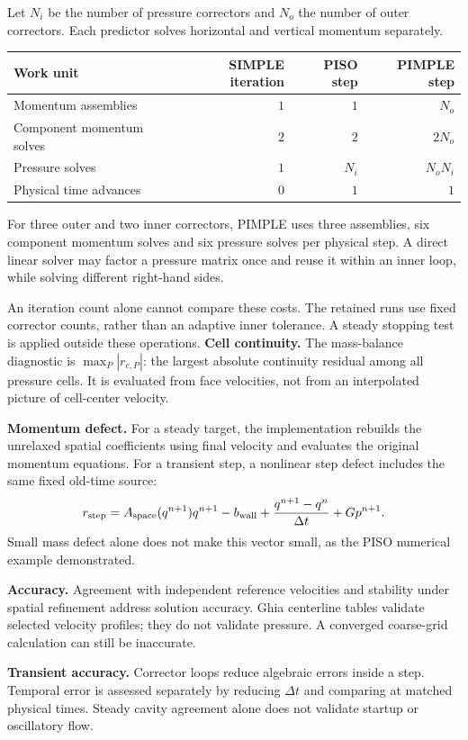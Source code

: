 Let $N_i$ be the number of pressure correctors and $N_o$ the number of outer correctors. Each predictor solves horizontal and vertical momentum separately.
\begin{center}\begin{tabular}{lrrr}\toprule
Work unit & SIMPLE iteration & PISO step & PIMPLE step\\\midrule
Momentum assemblies & $1$ & $1$ & $N_o$\\
Component momentum solves & $2$ & $2$ & $2N_o$\\
Pressure solves & $1$ & $N_i$ & $N_oN_i$\\
Physical time advances & $0$ & $1$ & $1$\\\bottomrule
\end{tabular}\end{center}
For three outer and two inner correctors, PIMPLE uses three assemblies, six component momentum solves and six pressure solves per physical step. A direct linear solver may factor a pressure matrix once and reuse it within an inner loop, while solving different right-hand sides.

An iteration count alone cannot compare these costs. The retained runs use fixed corrector counts, rather than an adaptive inner tolerance. A steady stopping test is applied outside these operations.
\newpage
{}
\textbf{Cell continuity.} The mass-balance diagnostic is $\max_P|r_{c,P}|$: the largest absolute continuity residual among all pressure cells. It is evaluated from face velocities, not from an interpolated picture of cell-center velocity.

\textbf{Momentum defect.} For a steady target, the implementation rebuilds the unrelaxed spatial coefficients using final velocity and evaluates the original momentum equations. For a transient step, a nonlinear step defect includes the same fixed old-time source:
\[
r_{\rm step}=A_{\rm space}(q^{n+1})q^{n+1}-b_{\rm wall}
+\frac{q^{n+1}-q^n}{\Delta t}+Gp^{n+1}.
\]
Small mass defect alone does not make this vector small, as the PISO numerical example demonstrated.

\textbf{Accuracy.} Agreement with independent reference velocities and stability under spatial refinement address solution accuracy. Ghia centerline tables validate selected velocity profiles; they do not validate pressure. A converged coarse-grid calculation can still be inaccurate.

\textbf{Transient accuracy.} Corrector loops reduce algebraic errors inside a step. Temporal error is assessed separately by reducing $\Delta t$ and comparing at matched physical times. Steady cavity agreement alone does not validate startup or oscillatory flow.

